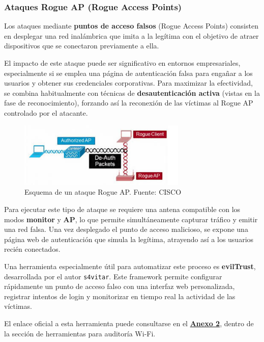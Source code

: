 \documentclass[a4paper, 11pt]{article}
\begin{document}

\subsubsection{Ataques Rogue AP (Rogue Access Points)}

Los ataques mediante \textbf{puntos de acceso falsos} (Rogue Access Points) consisten en desplegar una red inalámbrica que imita a la legítima con el objetivo de atraer dispositivos que se conectaron previamente a ella.

El impacto de este ataque puede ser significativo en entornos empresariales, especialmente si se emplea una página de autenticación falsa para engañar a los usuarios y obtener sus credenciales corporativas. Para maximizar la efectividad, se combina habitualmente con técnicas de \textbf{desautenticación activa} (vistas en la fase de reconocimiento), forzando así la reconexión de las víctimas al Rogue AP controlado por el atacante.


\begin{figure}[H]
\centering
\includegraphics[width=8cm]{images/rogue.jpeg}
\caption{Esquema de un ataque Rogue AP.  Fuente: CISCO}
\label{fig:rogue}
\end{figure}

Para ejecutar este tipo de ataque se requiere una antena compatible con los modos \textbf{monitor} y \textbf{AP}, lo que permite simultáneamente capturar tráfico y emitir una red falsa. Una vez desplegado el punto de acceso malicioso, se expone una página web de autenticación que simula la legítima, atrayendo así a los usuarios recién conectados.

Una herramienta especialmente útil para automatizar este proceso es \textbf{evilTrust}, desarrollada por el autor \texttt{s4vitar}. Este framework permite configurar rápidamente un punto de acceso falso con una interfaz web personalizada, registrar intentos de login y monitorizar en tiempo real la actividad de las víctimas.

El enlace oficial a esta herramienta puede consultarse en el \hyperref[anexo:2]{\textbf{Anexo 2}}, dentro de la sección de herramientas para auditoría Wi-Fi.
\end{document}
